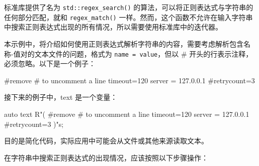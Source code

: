 
标准库提供了名为 \verb|std::regex_search()| 的算法，可以将正则表达式与字符串的任何部分匹配，就和 \verb|regex_match()| 一样。然而，这个函数不允许在输入字符串中搜索正则表达式出现的所有情况，所以需要使用标准库中的迭代器。

本示例中，将介绍如何使用正则表达式解析字符串的内容，需要考虑解析包含名称-值对的文本文件的问题，格式为 \verb|name = value|，但以 \# 开头的行表示注释，必须忽略。以下是一个例子：

\begin{shell}
#remove # to uncomment a line
timeout=120
server = 127.0.0.1
#retrycount=3
\end{shell}


接下来的例子中，text 是一个变量：

\begin{cpp}
auto text {
    R"(
    #remove # to uncomment a line
    timeout=120
    server = 127.0.0.1
    #retrycount=3
    )"s};
\end{cpp}

目的是简化代码，实际应用中可能会从文件或其他来源读取文本。


在字符串中搜索正则表达式的出现情况，应该按照以下步骤操作：

